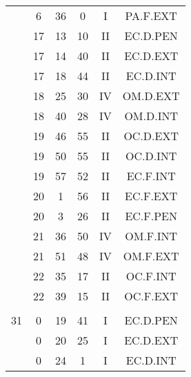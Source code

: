 \documentclass[12pt, a4paper]{article}
\begin{document}
\begin{multicols}{3}
{\begin{tabular}{c c c c c c}
	 	 	 	 & 6 & 36 & 0 & I & PA.F.EXT\\%
	 	 	 	 & 17 & 13 & 10 & II & EC.D.PEN\\%
	 	 	 	 & 17 & 14 & 40 & II & EC.D.EXT\\%
	 	 	 	 & 17 & 18 & 44 & II & EC.D.INT\\%
	 	 	 	 & 18 & 25 & 30 & IV & OM.D.EXT\\%
	 	 	 	 & 18 & 40 & 28 & IV & OM.D.INT\\%
	 	 	 	 & 19 & 46 & 55 & II & OC.D.EXT\\%
	 	 	 	 & 19 & 50 & 55 & II & OC.D.INT\\%
	 	 	 	 & 19 & 57 & 52 & II & EC.F.INT\\%
	 	 	 	 & 20 & 1 & 56 & II & EC.F.EXT\\%
	 	 	 	 & 20 & 3 & 26 & II & EC.F.PEN\\%
	 	 	 	 & 21 & 36 & 50 & IV & OM.F.INT\\%
	 	 	 	 & 21 & 51 & 48 & IV & OM.F.EXT\\%
	 	 	 	 & 22 & 35 & 17 & II & OC.F.INT\\%
	 	 	 	 & 22 & 39 & 15 & II & OC.F.EXT\\%
	 	 	 	 & & & & & \\%
	 	 	 	31 & 0 & 19 & 41 & I & EC.D.PEN\\%
	 	 	 	 & 0 & 20 & 25 & I & EC.D.EXT\\%
	 	 	 	 & 0 & 24 & 1 & I & EC.D.INT\\%
	 	 \end{tabular}
 	}
\end{multicols}
\end{document}

